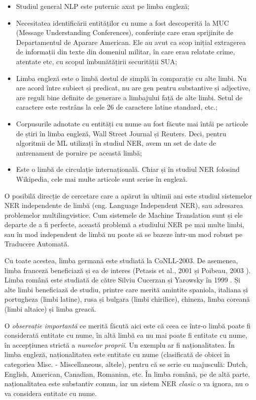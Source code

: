\begin{itemize}
	\item Studiul general NLP este puternic axat pe limba engleză;
	\item Necesitatea identificării entităților cu nume a fost descoperită la MUC (Message Understanding Conferences), conferințe care erau sprijinite de Departamentul de Aparare American. Ele au avut ca scop inițial extragerea de informații din texte din domeniul militar, în care erau relatate crime, atentate etc, cu scopul îmbunătățirii securității SUA;
	\item Limba engleză este o limbă destul de simplă în comparație cu alte limbi. Nu are acord între subiect și predicat, nu are gen pentru substantive și adjective, are reguli bine definite de generare a limbajului față de alte limbi. Setul de caractere este restrâns la cele 26 de caractere latine standard, etc.;
	\item Corpusurile adnotate cu entități cu nume au fost făcute mai întâi pe articole de știri în limba engleză, Wall Street Journal și Reuters. Deci, pentru algoritmii de ML utilizați în studiul NER, avem un set de date de antrenament de pornire pe această limbă;
	\item Este o limbă de circulație internațională. Chiar și în studiul NER folosind Wikipedia, cele mai multe articole sunt scrise în engleză.
\end{itemize}


O posibilă direcție de cercetare care a apărut în ultimii ani este studiul sistemelor NER independente de limbă (eng. Language Independent NER), sau adresarea problemelor multilingvistice. Cum sistemele de Machine Translation  sunt și ele departe de a fi perfecte, această problemă a studiului NER pe mai multe limbi, sau în mod independent de limbă nu poate să se bazeze într-un mod robust pe Traducere Automată.

Cu toate acestea, limba germană este studiată la CoNLL-2003\cite{conll2003}. De asemenea, limba franceză beneficiază și ea de interes (Petasis et al., 2001 \cite{Petasis01usingmachine} și Poibeau, 2003 \cite{And03themultilingual}). Limba română este studiată de către Silviu Cucerzan și Yarowsky în 1999 \cite{Cucerzan99languageindependent}. Și alte limbi beneficiază de studiu, printre care merită amintite spaniola, italiana și portugheza (limbi latine), rusa și bulgara (limbi chirilice), chineza, limba coreană (limbi altaice) și limba greacă.

O \textit{observație importantă} ce merită făcută aici este că ceea ce într-o limbă poate fi considerată entitate cu nume, în altă limbă ea nu mai poate fi entitate cu nume, în accepțiunea strictă a \textit{numelor proprii}. Un exemplu ar fi naționalitatea. În limba engleză, naționalitatea este entitate cu nume (clasificată de obicei în categoriea Misc. - Miscellaneous, altele), pentru că se scrie cu majusculă: Dutch, English, American, Canadian, Romanian, etc. În limba română, pe de altă parte, naționalitatea este substantiv comun, iar un sistem NER \textit{clasic} o va ignora, nu o va considera entitate cu nume.

